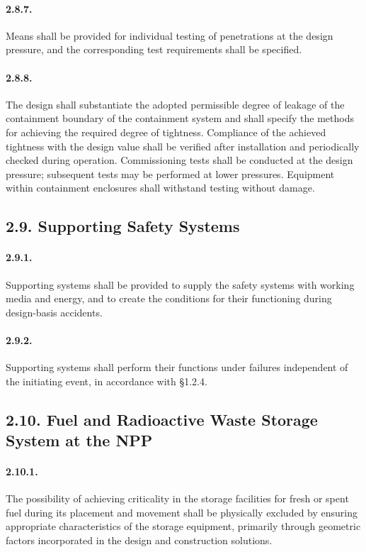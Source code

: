 \documentclass[openright]{bookest}
\begin{document}
\paragraph{2.8.7.}
Means shall be provided for individual testing of penetrations at the design pressure, and the corresponding test requirements shall be specified.

\paragraph{2.8.8.}
The design shall substantiate the adopted permissible degree of leakage of the containment boundary of the containment system and shall specify the methods for achieving the required degree of tightness.  
Compliance of the achieved tightness with the design value shall be verified after installation and periodically checked during operation.  
Commissioning tests shall be conducted at the design pressure; subsequent tests may be performed at lower pressures.  
Equipment within containment enclosures shall withstand testing without damage.

\subsection*{2.9. Supporting Safety Systems}

\paragraph{2.9.1.}
Supporting systems shall be provided to supply the safety systems with working media and energy, and to create the conditions for their functioning during design-basis accidents.

\paragraph{2.9.2.}
Supporting systems shall perform their functions under failures independent of the initiating event, in accordance with §1.2.4.

\subsection*{2.10. Fuel and Radioactive Waste Storage System at the NPP}

\paragraph{2.10.1.}
The possibility of achieving criticality in the storage facilities for fresh or spent fuel during its placement and movement shall be physically excluded by ensuring appropriate characteristics of the storage equipment, primarily through geometric factors incorporated in the design and construction solutions.
\end{document}
